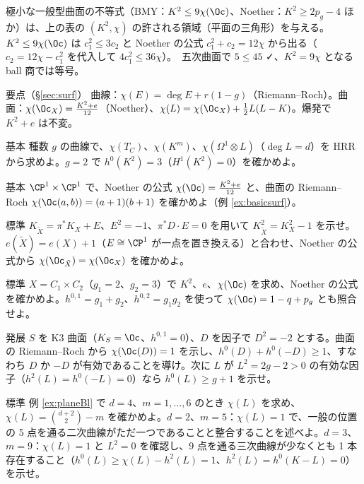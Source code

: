 極小な一般型曲面の不等式（BMY：$K^2\le9\chi(\Oc)$、Noether：$K^2\ge2p_g-4$ ほか）は、上の表の $(K^2,\chi)$ の許される領域（平面の三角形）を与える。$K^2\le9\chi(\Oc)$ は $c_1^2\le3c_2$ と Noether の公式 $c_1^2+c_2=12\chi$ から出る（$c_2=12\chi-c_1^2$ を代入して $4c_1^2\le36\chi$）。\tP\ 五次曲面で $5\le45$ ✓、$K^2=9\chi$ となる ball 商では等号。
\begin{keybox}{要点（\S\ref{sec:surf}）}
曲線：$\chi(E)=\deg E+r(1-g)$（Riemann--Roch）。曲面：$\chi(\Oc_X)=\frac{K^2+e}{12}$（Noether）、$\chi(L)=\chi(\Oc_X)+\frac12L(L-K)$。爆発で $K^2+e$ は不変。
\end{keybox}
\begin{prob}{基本}\label{p:curveHRR}
種数 $g$ の曲線で、$\chi(T_C)$、$\chi(K^m)$、$\chi(\Omega^1\otimes L)$（$\deg L=d$）を HRR から求めよ。$g=2$ で $h^0(K^2)=3$（$H^1(K^2)=0$）を確かめよ。
\end{prob}
\begin{prob}{基本}\label{p:P1P1}
$\CP^1\times\CP^1$ で、Noether の公式 $\chi(\Oc)=\frac{K^2+e}{12}$ と、曲面の Riemann--Roch $\chi(\Oc(a,b))=(a+1)(b+1)$ を確かめよ（例 \ref{ex:basicsurf}）。
\end{prob}
\begin{prob}{標準}\label{p:blowup}
$K_{\tilde X}=\pi^*K_X+E$、$E^2=-1$、$\pi^*D\cdot E=0$ を用いて $K_{\tilde X}^2=K_X^2-1$ を示せ。$e(\tilde X)=e(X)+1$（$E\cong\CP^1$ が一点を置き換える）と合わせ、Noether の公式から $\chi(\Oc_{\tilde X})=\chi(\Oc_X)$ を確かめよ。
\end{prob}
\begin{prob}{標準}\label{p:prodcurve}
$X=C_1\times C_2$（$g_1=2$、$g_2=3$）で $K^2$、$e$、$\chi(\Oc)$ を求め、Noether の公式を確かめよ。$h^{0,1}=g_1+g_2$、$h^{0,2}=g_1g_2$ を使って $\chi(\Oc)=1-q+p_g$ とも照合せよ。
\end{prob}
\begin{prob}{発展}\label{p:RRsurf}
$S$ を K3 曲面（$K_S=\Oc$、$h^{0,1}=0$）、$D$ を因子で $D^2=-2$ とする。曲面の Riemann--Roch から $\chi(\Oc(D))=1$ を示し、$h^0(D)+h^0(-D)\ge1$、すなわち $D$ か $-D$ が有効であることを導け。次に $L$ が $L^2=2g-2>0$ の有効な因子（$h^2(L)=h^0(-L)=0$）なら $h^0(L)\ge g+1$ を示せ。
\end{prob}


\begin{prob}{標準}\label{p:planepts}
例 \ref{ex:planeBl} で $d=4$、$m=1,\dots,6$ のとき $\chi(L)$ を求め、$\chi(L)=\binom{d+2}2-m$ を確かめよ。$d=2$、$m=5$：$\chi(L)=1$ で、一般の位置の 5 点を通る二次曲線がただ一つであることと整合することを述べよ。$d=3$、$m=9$：$\chi(L)=1$ と $L^2=0$ を確認し、9 点を通る三次曲線が少なくとも 1 本存在すること（$h^0(L)\ge\chi(L)-h^2(L)=1$、$h^2(L)=h^0(K-L)=0$）を示せ。
\end{prob}
